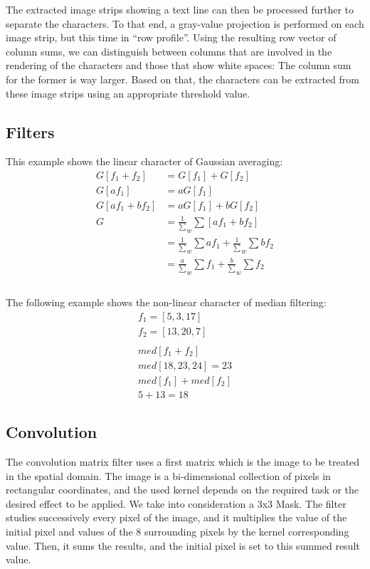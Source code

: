 \documentclass[a4paper,twocolumn]{article}
\begin{document}
	The extracted image strips showing a text line can then be processed further to separate the characters. To that end, a gray-value projection is performed on each image strip, but this time in ``row profile''. Using the resulting row vector of column sums, we can distinguish between columns that are involved in the rendering of the characters and those that show white spaces: The column sum for the former is way larger. Based on that, the characters can be extracted from these image strips using an appropriate threshold value.
	
	\subsection{Filters}
	
	This example shows the linear character of Gaussian averaging:
	\begin{align*}
	G[f_{1} + f_{2}] &= G[f_{1}] + G[f_{2}] \\
	G[af_{1}] &= aG[f_{1}] 	\\
	G[af_{1} + bf_{2}] &= aG[f_{1}] + bG[f_{2}]\\
	G &= \frac{{1}}\sum_{w} \sum{[af_{1} + bf_{2}]} \\
	&= \frac{{1}}\sum_{w} \sum{af_{1}} + \frac{{1}}\sum_{w} \sum{bf_{2}}	 \\
	&= \frac{{a}}\sum_{w} \sum{f_{1}} + \frac{{b}}\sum_{w} \sum{f_{2}}	\\ \\
	\end{align*}
	
	The following example shows the non-linear character of median filtering:
	\begin{align*}
	f_{1}= [5, 3, 17] \\
	f_{2}= [13, 20, 7] \\ \\
	med[f_{1} + f_{2}] \\
	med [18, 23, 24] = 23 \\
	med[f_{1}] + med[f_{2}] \\
	5 + 13 = 18
	\end{align*}
	
	\subsection{Convolution}
	
	The convolution matrix  filter uses a first matrix which is the image to be treated in the spatial domain. The image is a bi-dimensional collection of pixels in rectangular coordinates, and the used kernel depends on the required task or the desired effect to be applied. We take into consideration a 3x3 Mask. The  filter studies successively every pixel of the image, and it multiplies the value of the initial pixel and values of the 8 surrounding pixels by the kernel corresponding value. Then, it sums the results, and the initial pixel is set to this summed result value.
	
\end{document}
